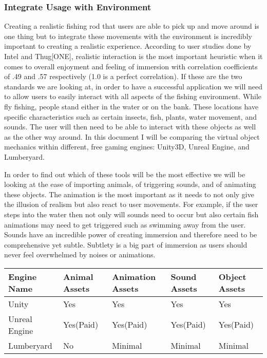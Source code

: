 \documentclass[10pt,journal,compsoc,onecolumn, draftclsnofoot]{IEEEtran}
\begin{document}
\subsubsection{Integrate Usage with Environment}
Creating a realistic fishing rod that users are able to pick up and move around is one thing but to integrate these movements with the environment is incredibly important to creating a realistic experience.
According to user studies done by Intel and Thug[ONE], realistic interaction is the most important heuristic when it comes to overall enjoyment and feeling of immersion with correlation coefficients of .49 and .57 respectively (1.0 is a perfect correlation).
If these are the two standards we are looking at, in order to have a successful application we will need to allow users to easily interact with all aspects of the fishing environment.
While fly fishing, people stand either in the water or on the bank.
These locations have specific characteristics such as certain insects, fish, plants, water movement, and sounds.
The user will then need to be able to interact with these objects as well as the other way around.
In this document I will be comparing the virtual object mechanics within different, free gaming engines: Unity3D, Unreal Engine, and Lumberyard.

In order to find out which of these tools will be the most effective we will be looking at the ease of importing animals, of triggering sounds, and of animating these objects.
The animation is the most important as it needs to not only give the illusion of realism but also react to user movements.
For example, if the user steps into the water then not only will sounds need to occur but also certain fish animations may need to get triggered such as swimming away from the user.
Sounds have an incredible power of creating immersion and therefore need to be comprehensive yet subtle.
Subtlety is a big part of immersion as users should never feel overwhelmed by noises or animations.

\vspace{2mm}
\begin{table}[h!]
\centering
  \begin{tabu} to 1.0\textwidth { | X[l] || X[c] | X[c] | X[c] | X[c] |  }
  \hline
  Engine Name & Animal Assets & Animation Assets & Sound Assets & Object Assets\\
  \hline
  Unity  & Yes & Yes & Yes & Yes\\
  Unreal Engine &   Yes(Paid) & Yes(Paid) & Yes(Paid) & Yes(Paid)\\
  Lumberyard & No & Minimal & Minimal & Minimal \\
  \hline
  \end{tabu}
\end{table}
\vspace{2mm}
\end{document}
